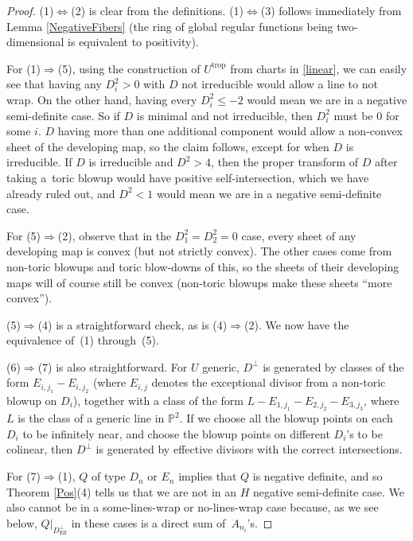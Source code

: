 \documentclass[10pt,a4paper]{amsart}
\numberwithin{equation}{section}
\numberwithin{figure}{section}
\numberwithin{table}{section}
\DeclareMathOperator{\trop}{trop}
\DeclareMathOperator{\Eff}{Eff}
\let\bb=\mathbb
\theoremstyle{definition}
\begin{document}
\begin{proof}(1)$\Leftrightarrow$(2) is clear from the definitions. (1)$\Leftrightarrow$(3) follows immediately from Lemma \ref{NegativeFibers} (the ring of global regular functions being two-dimensional is equivalent to positivity).

For (1)$\Rightarrow$(5), using the construction of $U^{\trop}$ from charts in \eqref{linear}, we can easily see that having any $D_i^2>0$ with $D$ not irreducible would allow a line to not wrap. On the other hand, having every $D_i^2 \leq -2$ would mean we are in a negative semi-definite case. So if $D$ is minimal and not irreducible, then $D_i^2$ must be $0$ for some $i$. $D$ having more than one additional component would allow a non-convex sheet of the developing map, so the claim follows, except for when $D$ is irreducible. If $D$ is irreducible and $D^2 > 4$, then the proper transform of $D$ after taking a~toric blowup would have positive self-intersection, which we have already ruled out, and $D^2<1$ would mean we are in a negative semi-definite case.

For (5)$\Rightarrow$(2), observe that in the $D_1^2=D_2^2=0$ case, every sheet of any developing map is convex (but not strictly convex). The other cases come from non-toric blowups and toric blow-downs of this, so the sheets of their developing maps will of course still be convex (non-toric blowups make these sheets ``more convex'').

(5)$\Rightarrow$(4) is a straightforward check, as is (4)$\Rightarrow$(2). We now have the equivalence of~(1) through~(5).

(6)$\Rightarrow$(7) is also straightforward. For $U$ generic, $D^{\perp}$ is generated by classes of the form $E_{i,j_1}-E_{i,j_2}$ (where $E_{i,j}$ denotes the exceptional divisor from a non-toric blowup on $D_i$), together with a class of the form $L-E_{1,j_1} - E_{2,j_2} - E_{3,j_3}$, where $L$ is the class of a generic line in $\bb{P}^2$. If we choose all the blowup points on each $D_i$ to be infinitely near, and choose the blowup points on different $D_i$'s to be colinear, then $D^{\perp}$ is generated by effective divisors with the correct intersections.

For (7)$\Rightarrow$(1), $Q$ of type $D_n$ or $E_n$ implies that $Q$ is negative definite, and so Theorem \ref{Pos}(4) tells us that we are not in an $H$ negative semi-definite case. We also cannot be in a some-lines-wrap or no-lines-wrap case because, as we see below, $Q|_{D^{\perp}_{\Eff}}$ in these cases is a direct sum of~$A_{n_i}$'s.


\end{proof}
\end{document}

